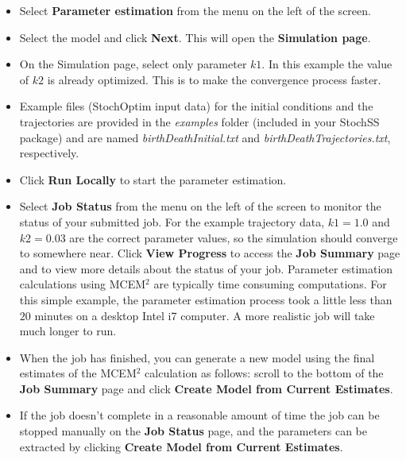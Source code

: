 \begin{itemize}
\item Select \textbf{Parameter estimation} from the menu on the left of the screen.
\item Select the model and click \textbf{Next}. This will open the \textbf{Simulation page}.
\item On the Simulation page, select only parameter $k1$. In this example the value of $k2$ is already optimized. This is to make the convergence process faster.
\item Example files (StochOptim input data) for the initial conditions and the trajectories are provided in the \textit{examples} folder (included in your StochSS package) and are named \textit{birthDeathInitial.txt} and \textit{birthDeathTrajectories.txt}, respectively.
\item Click \textbf{Run Locally} to start the parameter estimation.
\item Select \textbf{Job Status} from the menu on the left of the screen to monitor the status of your submitted job. For the example trajectory data, $k1 = 1.0$ and $k2 = 0.03$ are the correct parameter values, so the simulation should converge to somewhere near.
Click \textbf{View Progress} to access the \textbf{Job Summary} page and to view more details about the status of your job. Parameter estimation calculations using MCEM$^2$ are typically time consuming computations. For this simple example, the parameter estimation process took a little less than $20$ minutes on a desktop Intel i7 computer. A more realistic job will take much longer to run.

\item When the job has finished, you can generate a new model using the final estimates of the MCEM$^2$ calculation as follows: scroll to the bottom of the \textbf{Job Summary} page and click \textbf{Create Model from Current Estimates}. 
\item If the job doesn't complete in a reasonable amount of time the job can be stopped manually on the \textbf{Job Status} page, and the parameters can be extracted by clicking \textbf{Create Model from Current Estimates}.
\end{itemize}

